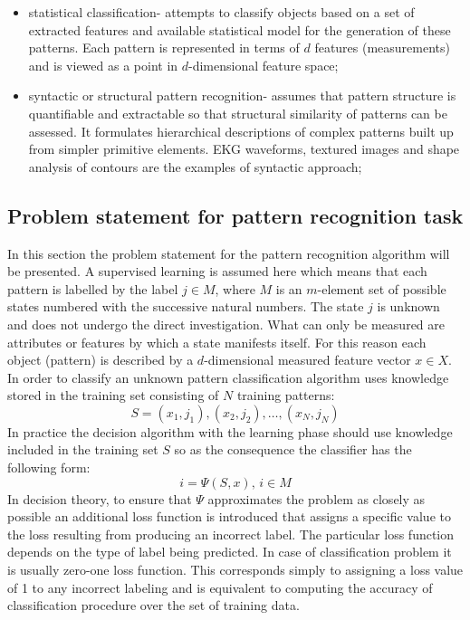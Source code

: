 \begin{itemize}
    \item statistical classification- attempts to classify objects
        based on a set of extracted features and available
        statistical model for the generation of these patterns. 
        Each pattern is represented in terms of $d$ features (measurements) 
        and is viewed as a point in $d$-dimensional feature space;
    \item syntactic or structural pattern recognition- assumes that pattern
        structure is quantifiable and extractable so that structural
        similarity of patterns can be assessed. It formulates hierarchical
        descriptions of complex patterns built up from simpler
        primitive elements. EKG waveforms, textured images and shape analysis 
        of contours are the examples of syntactic approach;
\end{itemize}

\subsection{Problem statement for pattern recognition task}
\label{cha:Problem_statement}
In this section the problem statement for the pattern
recognition algorithm will be presented. A supervised learning is assumed here which
means that each pattern is labelled by the label $j \in M$, where $M$ is an $m$-element set of
possible states numbered with the successive natural numbers. The state $j$ is
unknown and does not undergo the direct investigation. What can only be
measured are attributes or features by which a state manifests itself. For this
reason each object (pattern) is described by a $d$-dimensional measured feature vector $x \in
X$. In order to classify an unknown pattern classification algorithm uses knowledge stored in the training
set consisting of $N$ training patterns:
\begin{equation}
    S = (x_1, j_1), (x_2, j_2), \ldots, (x_N, j_N)
    \label{eq:training_pattern}
\end{equation}
In practice the decision algorithm with the learning phase should use knowledge included in the
training set $S$ so as the consequence the classifier has the following form:
\begin{equation}
    i=\Psi(S, x), \, i \in M
    \label{eq:decision_algorithm}
\end{equation}
In decision theory, to ensure that $\Psi$ approximates the problem as closely
as possible an additional loss function is introduced that assigns a specific
value to the loss resulting from producing an incorrect label. The particular loss
function depends on the type of label being predicted. In case of
classification problem it is usually zero-one loss function. This corresponds simply to
assigning a loss value of 1 to any incorrect labeling and is equivalent to computing
the accuracy of classification procedure over the set of training data.

